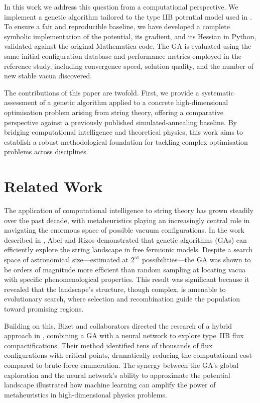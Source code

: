 \documentclass[runningheads]{llncs}
\begin{document}
In this work we address this question from a computational
perspective. We implement a genetic algorithm tailored to the
type IIB potential model used in \cite{Damian2022}. To ensure a
fair and reproducible baseline, we have developed a complete
symbolic implementation of the potential, its gradient, and its
Hessian in Python, validated against the original Mathematica
code. The GA is evaluated using the same initial configuration
database and performance metrics employed in the reference
study, including convergence speed, solution quality, and the
number of new stable vacua discovered.

The contributions of this paper are twofold. First, we provide
a systematic assessment of a genetic algorithm applied to a
concrete high‑dimensional optimisation problem arising from
string theory, offering a comparative perspective against a
previously published simulated‑annealing baseline. By
bridging computational intelligence and theoretical physics,
this work aims to establish a robust methodological foundation
for tackling complex optimisation problems across disciplines.

%

\section{Related Work}

The application of computational intelligence to string theory
has grown steadily over the past decade, with metaheuristics
playing an increasingly central role in navigating the enormous
space of possible vacuum configurations. In the work described
in \cite{Abel2014}, Abel and Rizos demonstrated that genetic
algorithms (GAs) can efficiently explore the string landscape
in free fermionic models. Despite a search space of
astronomical size—estimated at \(2^{51}\) possibilities—the GA
was shown to be orders of magnitude more efficient than random
sampling at locating vacua with specific phenomenological
properties. This result was significant because it revealed
that the landscape’s structure, though complex, is amenable to
evolutionary search, where selection and recombination guide
the population toward promising regions.

Building on this, Bizet and collaborators directed the
research of a hybrid approach in \cite{Bizet2020},
combining a GA with a neural network to explore type~IIB
flux compactifications. Their method identified tens of
thousands of flux configurations with critical points,
dramatically reducing the computational cost compared to
brute‑force enumeration. The synergy between the GA’s
global exploration and the neural network’s ability to
approximate the potential landscape illustrated how
machine learning can amplify the power of metaheuristics
in high‑dimensional physics problems.
\end{document}
